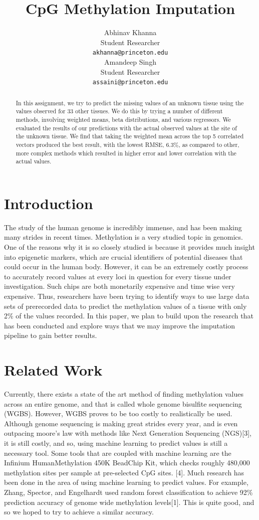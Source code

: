 \documentclass{article} %
\title{CpG Methylation Imputation}
\author{
Abhinav Khanna\\
Student Researcher\\
\texttt{akhanna@princeton.edu} \\
\And
Amandeep Singh \\
Student Researcher \\
\texttt{assaini@princeton.edu} \\
}
\begin{document}
\maketitle

\begin{abstract}
In this assignment, we try to predict the missing values of an unknown tissue using the values observed for 33 other tissues. We do this by trying a number of different methods, involving weighted means, beta distributions, and various regressors. We evaluated the results of our predictions with the actual observed values at the site of the unknown tissue.  We find that taking the weighted mean across the top 5 correlated vectors produced the best result, with the lowest RMSE, 6.3\%, as compared to other, more complex methods which resulted in higher error and lower correlation with the actual values. 
\end{abstract}

\section{Introduction}
The study of the human genome is incredibly immense, and has been making many strides in recent times. Methylation is a very studied topic in genomics. One of the reasons why it is so closely studied is because it provides much insight into epigenetic markers, which are crucial identifiers of potential diseases that could occur in the human body. However, it can be an extremely costly process to accurately record values at every loci in question for every tissue under investigation. Such chips are both monetarily expensive and time wise very expensive. Thus, researchers have been trying to identify ways to use large data sets of prerecorded data to predict the methylation values of a tissue with only 2\% of the values recorded. In this paper, we plan to build upon the research that has been conducted and explore ways that we may improve the imputation pipeline to gain better results.

\section{Related Work}
Currently, there exists a state of the art method of finding methylation values across an entire genome, and that is called whole genome bisulfite sequencing (WGBS). However, WGBS proves to be too costly to realistically be used. Although genome sequencing is making great strides every year, and is even outpacing moore’s law with methods like Next Generation Sequencing (NGS)[3], it is still costly, and so, using machine learning to predict values is still a necessary tool. 
	Some tools that are coupled with machine learning are the Infinium HumanMethylation 450K BeadChip Kit, which checks roughly 480,000 methylation sites per sample at pre-selected CpG sites. [4]. Much research has been done in the area of using  machine learning to predict values. For example, Zhang, Spector, and Engelhardt used random forest classification to achieve 92\% prediction accuracy of genome wide methylation levels[1]. This is quite good, and so we hoped to try to achieve a similar accuracy.
\end{document}
